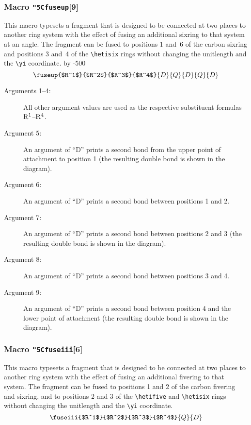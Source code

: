 \subsubsection{Macro {\tt\char"5C{}fuseup}[9]}
  This macro typesets a fragment that is designed to be
 connected at two places to another ring system with the
 effect of fusing an additional sixring to that system
 at an angle. The fragment can be fused to positions
 1 and~6 of the carbon sixring and positions 3 and~4 of
 the \verb+\hetisix+ rings without changing the unitlength
 and the \verb+\yi+ coordinate.
 \advance \yi by -500
 \[ \fuseup{$R^1$}{$R^2$}{$R^3$}{$R^4$}{D}{Q}{D}{Q}{D} \]
 
 \begin{description}
 \item[{\rm Arguments 1--4:}] \rhq  All other
      argument values are used as the respective substituent
      formulas ${\rm R^1}$--${\rm R^4}$.
 \item[{\rm Argument 5:}] An argument of ``D'' prints
      a second bond from the upper point of attachment to
      position 1 (the resulting double bond is shown in the
      diagram). \rii
 \item[{\rm Argument 6:}] An argument of ``D'' prints
      a second bond between positions 1 and 2. \rii
 \item[{\rm Argument 7:}] An argument of ``D'' prints
      a second bond between positions 2 and 3 (the resulting
      double bond is shown in the diagram). \rii
 \item[{\rm Argument 8:}] An argument of ``D'' prints
      a second bond between positions 3 and 4. \rii
 \item[{\rm Argument 9:}] An argument of ``D'' prints
      a second bond between position 4 and the lower point
      of attachment (the resulting double bond is shown in
      the diagram). \rii
 \end{description}
 
\subsubsection{Macro {\tt\char"5C{}fuseiii}[6]}
  This macro typesets a fragment that is designed to be
 connected at two places to another ring system with the
 effect of fusing an additional fivering to that system.
 The fragment can be fused to positions 1 and 2 of the
 carbon fivering and sixring, and to positions 2 and 3 of
 the \verb+\hetifive+ and \verb+\hetisix+ rings
 without changing the unitlength and the \verb+\yi+
 coordinate.
 \[ \fuseiii{$R^1$}{$R^2$}{$R^3$}{$R^4$}{Q}{D}   \]
 
